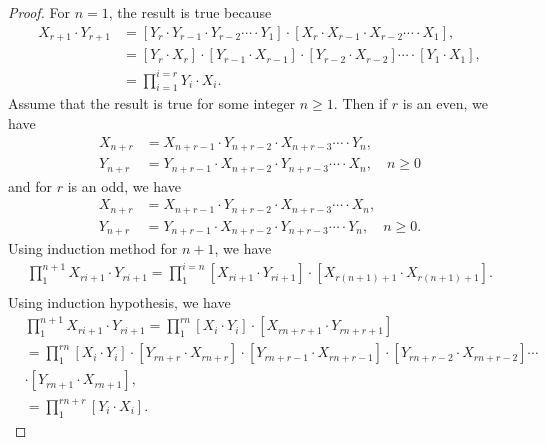 \begin{proof}
For $n=1$, the result is true because
\begin{align*}
X_{r+1}\cdot Y_{r+1}&=\left[Y_{r}\cdot Y_{r-1}\cdot Y_{r-2}\cdots\cdot Y_{1}\right]\cdot\left[X_{r}\cdot X_{r-1}\cdot X_{r-2}\cdots\cdot X_{1}\right],\\
&=\left[Y_{r}\cdot X_{r}\right]\cdot \left[Y_{r-1}\cdot X_{r-1}\right]\cdot \left[Y_{r-2}\cdot X_{r-2}\right]\cdots\cdot \left[Y_{1}\cdot X_{1}\right],\\
&=\displaystyle\prod_{i=1}^{i=r}Y_{i}\cdot X_{i}.
\end{align*}
Assume that the result is true for some integer $n\geq1$. Then if $r$ is an even, we have
	\begin{align*}
	X_{n+r}&=X_{n+r-1}\cdot Y_{n+r-2}\cdot X_{n+r-3}\cdots\cdot Y_{n},\\
	Y_{n+r}&=Y_{n+r-1}\cdot X_{n+r-2}\cdot Y_{n+r-3}\cdots\cdot X_{n},\quad n\geq 0
	\end{align*}
		and for $r$ is an odd, we have
	\begin{align*}
	X_{n+r}&=X_{n+r-1}\cdot Y_{n+r-2}\cdot X_{n+r-3}\cdots\cdot X_{n},\\
	Y_{n+r}&=Y_{n+r-1}\cdot X_{n+r-2}\cdot Y_{n+r-3}\cdots\cdot Y_{n},\quad n\geq 0.
	\end{align*}
Using induction method for $n+1$, we have
\noindent 
\begin{align*}
\displaystyle\prod_{1}^{n+1}X_{ri+1}\cdot Y_{ri+1}=\displaystyle\prod_{1}^{i=n}\left[X_{ri+1}\cdot Y_{ri+1}\right]\cdot \left[X_{r(n+1)+1}\cdot X_{r(n+1)+1}\right].\\
\end{align*}
Using induction hypothesis, we have
\begin{align*}
&\displaystyle\prod_{1}^{n+1}X_{ri+1}\cdot Y_{ri+1}=\displaystyle\prod_{1}^{rn}\left[X_{i}\cdot Y_{i}\right]\cdot \left[X_{rn+r+1}\cdot Y_{rn+r+1}\right] \\
&=\displaystyle\prod_{1}^{rn}\left[X_{i}\cdot Y_{i}\right]\cdot \left[Y_{rn+r}\cdot X_{rn+r}\right]\cdot \left[Y_{rn+r-1}\cdot X_{rn+r-1}\right]\cdot \left[Y_{rn+r-2}\cdot X_{rn+r-2}\right]\cdots \\&\cdot \left[Y_{rn+1}\cdot X_{rn+1}\right],\\
&=\displaystyle\prod_{1}^{rn+r}\left[Y_{i}\cdot X_{i}\right].
\end{align*}
\end{proof}
